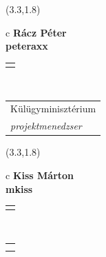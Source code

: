 \documentclass[11pt]{article}
\begin{document}
\makebox(3.3,1.8){
  \renewcommand\arraystretch{1.3}
  \begin{tabular}[c]{c}
    \hspace{8.5mm}
    \LARGE\bf{ Rácz Péter }\\
    \hspace{8.5mm}
    \Large{ peteraxx }\\
    \renewcommand\arraystretch{3}
    \begin{tabular}[c]{c}
      \centering
      \fontfamily{phv}\selectfont{
        \textbf{
          \textsc{
            \scriptsize{
            \color{Dark}{ Ismerkedő }\color{Bright}{ Webmester }\color{Bright}{ Sminkmester }\color{Bright}{ Programozó }
            }
          }
        }
      }
    \end{tabular}
    \\
    \renewcommand\arraystretch{1}
    \begin{tabular}{p{3.3in}}
      \hspace{.7cm}Külügyminisztérium\\
      \hspace{.7cm}\emph{ projektmenedzser }\\
    \end{tabular}
  \end{tabular}
}

\makebox(3.3,1.8){
  \renewcommand\arraystretch{1.3}
  \begin{tabular}[c]{c}
    \hspace{8.5mm}
    \LARGE\bf{ Kiss Márton }\\
    \hspace{8.5mm}
    \Large{ mkiss }\\
    \renewcommand\arraystretch{3}
    \begin{tabular}[c]{c}
      \centering
      \fontfamily{phv}\selectfont{
        \textbf{
          \textsc{
            \scriptsize{
            \color{Bright}{ Ismerkedő }\color{Bright}{ Webmester }\color{Bright}{ Sminkmester }\color{Bright}{ Programozó }
            }
          }
        }
      }
    \end{tabular}
    \\
    \renewcommand\arraystretch{1}
    \begin{tabular}{p{3.3in}}
      \hspace{.7cm}\\
      \hspace{.7cm}\emph{  }\\
    \end{tabular}
  \end{tabular}
}
\end{document}
